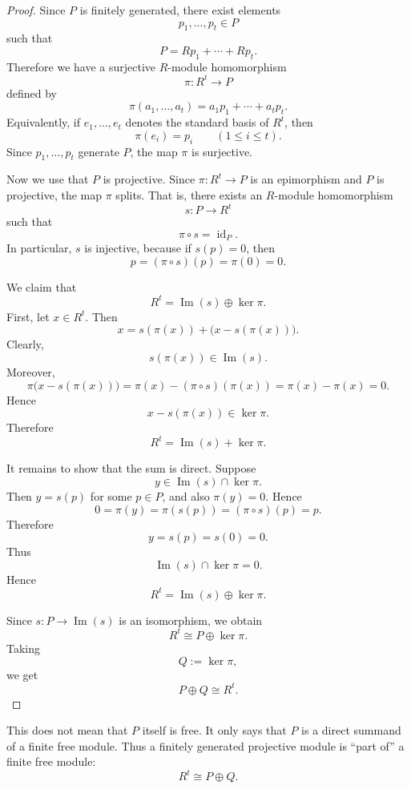 \begin{proof}
    Since $P$ is finitely generated, there exist elements
    \[
        p_1,\dots,p_t\in P
    \]
    such that
    \[
        P=Rp_1+\cdots+Rp_t.
    \]
    Therefore we have a surjective $R$-module homomorphism
    \[
        \pi:R^t\longrightarrow P
    \]
    defined by
    \[
        \pi(a_1,\dots,a_t)=a_1p_1+\cdots+a_tp_t.
    \]
    Equivalently, if $e_1,\dots,e_t$ denotes the standard basis of $R^t$, then
    \[
        \pi(e_i)=p_i
        \qquad
        (1\leq i\leq t).
    \]
    Since $p_1,\dots,p_t$ generate $P$, the map $\pi$ is surjective.

    Now we use that $P$ is projective. Since $\pi:R^t\to P$ is an epimorphism and
    $P$ is projective, the map $\pi$ splits. That is, there exists an $R$-module
    homomorphism
    \[
        s:P\longrightarrow R^t
    \]
    such that
    \[
        \pi\circ s=\operatorname{id}_P.
    \]
    In particular, $s$ is injective, because if $s(p)=0$, then
    \[
        p=(\pi\circ s)(p)=\pi(0)=0.
    \]

    We claim that
    \[
        R^t=\operatorname{Im}(s)\oplus \ker\pi.
    \]
    First, let $x\in R^t$. Then
    \[
        x=s(\pi(x))+\bigl(x-s(\pi(x))\bigr).
    \]
    Clearly,
    \[
        s(\pi(x))\in \operatorname{Im}(s).
    \]
    Moreover,
    \[
        \pi\bigl(x-s(\pi(x))\bigr)
        =
        \pi(x)-(\pi\circ s)(\pi(x))
        =
        \pi(x)-\pi(x)
        =
        0.
    \]
    Hence
    \[
        x-s(\pi(x))\in \ker\pi.
    \]
    Therefore
    \[
        R^t=\operatorname{Im}(s)+\ker\pi.
    \]

    It remains to show that the sum is direct. Suppose
    \[
        y\in \operatorname{Im}(s)\cap \ker\pi.
    \]
    Then $y=s(p)$ for some $p\in P$, and also $\pi(y)=0$. Hence
    \[
        0=\pi(y)=\pi(s(p))=(\pi\circ s)(p)=p.
    \]
    Therefore
    \[
        y=s(p)=s(0)=0.
    \]
    Thus
    \[
        \operatorname{Im}(s)\cap \ker\pi=0.
    \]
    Hence
    \[
        R^t=\operatorname{Im}(s)\oplus \ker\pi.
    \]

    Since $s:P\to \operatorname{Im}(s)$ is an isomorphism, we obtain
    \[
        R^t\cong P\oplus \ker\pi.
    \]
    Taking
    \[
        Q:=\ker\pi,
    \]
    we get
    \[
        P\oplus Q\cong R^t.
    \]
\end{proof}

\begin{remark}
    This does not mean that $P$ itself is free. It only says that $P$ is a direct
    summand of a finite free module. Thus a finitely generated projective module is
    ``part of'' a finite free module:
    \[
        R^t\cong P\oplus Q.
    \]
\end{remark}

